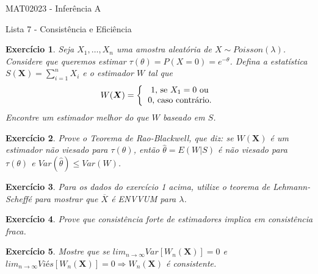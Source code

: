 \documentclass[letter,11pt]{article}
\newtheorem{exer}{Exercício}
\begin{document}
\begin{center}{ \Large MAT02023 - Inferência A }\end{center}

\begin{center}
{\large  \sc Lista 7 - Consistência e Eficiência}
\end{center}
\vspace{5mm}

\begin{exer} \rm
Seja $X_1, \ldots, X_n$ uma amostra aleatória de $X \sim Poisson(\lambda)$. Considere que queremos estimar $\tau(\theta) = P(X=0) = e^{-\theta}$. Defina a estatística $S(\boldsymbol{X}) = \sum_{i=1}^n X_i$ e o estimador $W$ tal que
\begin{equation}
W(\boldsymbol{X}) = \left\{
\begin{tabular}{c}
1, se $X_1 = 0$ ou \nonumber \\
0, caso contrário. \nonumber
\end{tabular}
\right.
\end{equation}
Encontre um estimador melhor do que $W$ baseado em $S$.
\end{exer}


\begin{exer} \rm
Prove o Teorema de Rao-Blackwell, que diz: se $W(\boldsymbol{X})$ é um estimador não viesado para $\tau(\theta)$, então $\widehat{\theta} = E \left( W \vert S\right)$ é não viesado para $\tau(\theta)$ e $Var ( \widehat{\theta} ) \leq Var \left( W \right)$.
\end{exer}


\begin{exer} \rm
Para os dados do exercício 1 acima, utilize o teorema de Lehmann-Scheffé para mostrar que $\overline{X}$ é ENVVUM para $\lambda$.
\end{exer}


\begin{exer} \rm
Prove que consistência forte de estimadores implica em consistência fraca. %
\end{exer}


\begin{exer} \rm
Mostre que se $lim_{n \rightarrow \infty} Var \left[ W_n(\boldsymbol{X}) \right] = 0$ e $lim_{n \rightarrow \infty} \textit{Viés} \left[ W_n(\boldsymbol{X}) \right] = 0 \Rightarrow W_n(\boldsymbol{X})$ é consistente.
\end{exer}
\end{document}
